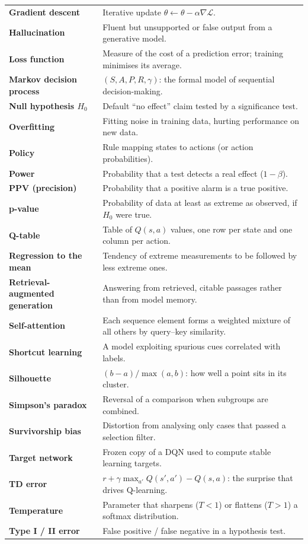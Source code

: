 \documentclass[11pt]{article}
\begin{document}
{\begin{longtable}{>{\bfseries}p{3.6cm}p{11.4cm}}
Gradient descent & Iterative update $\theta\leftarrow\theta-\alpha\nabla\mathcal L$.\\
Hallucination & Fluent but unsupported or false output from a generative model.\\
Loss function & Measure of the cost of a prediction error; training minimises its average.\\
Markov decision process & $(S,A,P,R,\gamma)$: the formal model of sequential decision-making.\\
Null hypothesis $H_0$ & Default ``no effect'' claim tested by a significance test.\\
Overfitting & Fitting noise in training data, hurting performance on new data.\\
Policy & Rule mapping states to actions (or action probabilities).\\
Power & Probability that a test detects a real effect ($1-\beta$).\\
PPV (precision) & Probability that a positive alarm is a true positive.\\
p-value & Probability of data at least as extreme as observed, if $H_0$ were true.\\
Q-table & Table of $Q(s,a)$ values, one row per state and one column per action.\\
Regression to the mean & Tendency of extreme measurements to be followed by less extreme ones.\\
Retrieval-augmented generation & Answering from retrieved, citable passages rather than from model memory.\\
Self-attention & Each sequence element forms a weighted mixture of all others by query--key similarity.\\
Shortcut learning & A model exploiting spurious cues correlated with labels.\\
Silhouette & $(b-a)/\max(a,b)$: how well a point sits in its cluster.\\
Simpson's paradox & Reversal of a comparison when subgroups are combined.\\
Survivorship bias & Distortion from analysing only cases that passed a selection filter.\\
Target network & Frozen copy of a DQN used to compute stable learning targets.\\
TD error & $r+\gamma\max_{a'}Q(s',a')-Q(s,a)$: the surprise that drives Q-learning.\\
Temperature & Parameter that sharpens ($T<1$) or flattens ($T>1$) a softmax distribution.\\
Type I / II error & False positive / false negative in a hypothesis test.\\\bottomrule
\end{longtable}}
\end{document}
